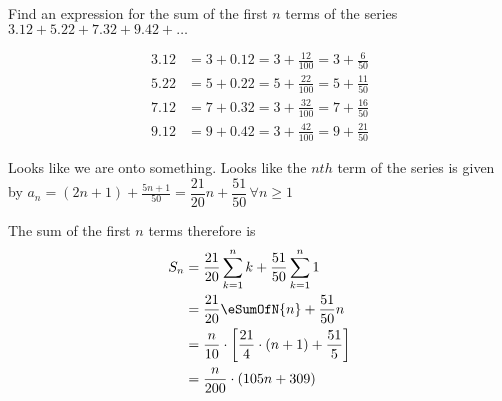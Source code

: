 
%
%
%
%
% 
% 

\question[4] Find an expression for the sum of the first $n$ terms of the series 
$3.12 + 5.22 + 7.32 + 9.42 + \ldots$


\ifprintanswers
\fi 

\begin{solution}[\halfpage]
	\begin{align}
		3.12 &= 3 + 0.12 = 3 + \frac{12}{100} = 3 + \frac{6}{50} \\
		5.22 &= 5 + 0.22 = 5 + \frac{22}{100} = 5 + \frac{11}{50} \\
		7.12 &= 7 + 0.32 = 3 + \frac{32}{100} = 7 + \frac{16}{50} \\
		9.12 &= 9 + 0.42 = 3 + \frac{42}{100} = 9 + \frac{21}{50}
	\end{align}
	
	Looks like we are onto something. Looks like the $nth$ term of the series
	is given by $a_n = (2n+1) + \frac{5n+1}{50} = \dfrac{21}{20}n + \dfrac{51}{50}\, \forall n \geq 1$
	
	The sum of the first $n$ terms therefore is
	\begin{align}
		S_n &= \dfrac{21}{20}\sum_{k=1}^{n}k + \dfrac{51}{50}\sum_{k=1}^{n}1 \\
		&= \dfrac{21}{20}\eSumOfN{n} + \dfrac{51}{50}n \\
		&= \dfrac{n}{10}\cdot\left[ \dfrac{21}{4}\cdot(n+1) + \dfrac{51}{5}\right] \\
		&= \dfrac{n}{200}\cdot(105n + 309)
	\end{align}
\end{solution}
